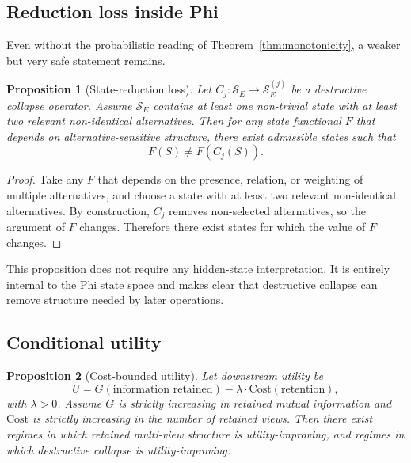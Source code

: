 \documentclass[11pt,a4paper]{article}
\newtheorem{proposition}{Proposition}
\begin{document}
\subsection{Reduction loss inside Phi}

Even without the probabilistic reading of Theorem~\ref{thm:monotonicity}, a weaker but very safe statement remains.

\begin{proposition}[State-reduction loss]
\label{prop:reduction}
Let $C_j : \mathcal{S}_E \to \mathcal{S}_E^{(j)}$ be a destructive collapse operator. Assume $\mathcal{S}_E$ contains at least one non-trivial state with at least two relevant non-identical alternatives. Then for any state functional $F$ that depends on alternative-sensitive structure, there exist admissible states such that
\begin{equation}
F(S) \neq F(C_j(S)).
\end{equation}
\end{proposition}

\begin{proof}
Take any $F$ that depends on the presence, relation, or weighting of multiple alternatives, and choose a state with at least two relevant non-identical alternatives. By construction, $C_j$ removes non-selected alternatives, so the argument of $F$ changes. Therefore there exist states for which the value of $F$ changes.
\end{proof}

This proposition does not require any hidden-state interpretation. It is entirely internal to the Phi state space and makes clear that destructive collapse can remove structure needed by later operations.

\subsection{Conditional utility}

\begin{proposition}[Cost-bounded utility]
\label{prop:utility}
Let downstream utility be
\begin{equation}
U = G(\text{information retained}) - \lambda \cdot \text{Cost}(\text{retention}),
\end{equation}
with $\lambda > 0$. Assume $G$ is strictly increasing in retained mutual information and $\text{Cost}$ is strictly increasing in the number of retained views. Then there exist regimes in which retained multi-view structure is utility-improving, and regimes in which destructive collapse is utility-improving.
\end{proposition}
\end{document}
